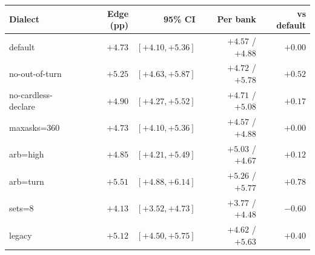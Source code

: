 \begin{tabular}{lrrrr}
\toprule
Dialect & Edge (pp) & 95\% CI & Per bank & vs default \\
\midrule
default & $+4.73$ & $[+4.10, +5.36]$ & $+4.57$ / $+4.88$ & $+0.00$ \\
no-out-of-turn & $+5.25$ & $[+4.63, +5.87]$ & $+4.72$ / $+5.78$ & $+0.52$ \\
no-cardless-declare & $+4.90$ & $[+4.27, +5.52]$ & $+4.71$ / $+5.08$ & $+0.17$ \\
maxasks=360 & $+4.73$ & $[+4.10, +5.36]$ & $+4.57$ / $+4.88$ & $+0.00$ \\
arb=high & $+4.85$ & $[+4.21, +5.49]$ & $+5.03$ / $+4.67$ & $+0.12$ \\
arb=turn & $+5.51$ & $[+4.88, +6.14]$ & $+5.26$ / $+5.77$ & $+0.78$ \\
sets=8 & $+4.13$ & $[+3.52, +4.73]$ & $+3.77$ / $+4.48$ & $-0.60$ \\
legacy & $+5.12$ & $[+4.50, +5.75]$ & $+4.62$ / $+5.63$ & $+0.40$ \\
\bottomrule
\end{tabular}
